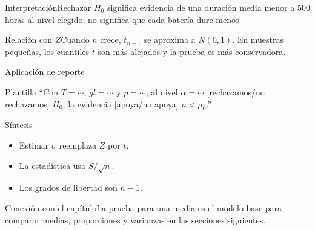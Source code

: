 \documentclass[10pt,aspectratio=169]{beamer}
\begin{document}
\begin{frame}{Interpretación}\small Rechazar $H_0$ significa evidencia de una duración media menor a $500$ horas al nivel elegido; no significa que cada batería dure menos.\end{frame}
\begin{frame}{Relación con $Z$}\small Cuando $n$ crece, $t_{n-1}$ se aproxima a $N(0,1)$. En muestras pequeñas, los cuantiles $t$ son más alejados y la prueba es más conservadora.\end{frame}
\begin{frame}{Aplicación de reporte}\small\begin{block}{Plantilla} ``Con $T=\cdots$, $gl=\cdots$ y $p=\cdots$, al nivel $\alpha=\cdots$ [rechazamos/no rechazamos] $H_0$; la evidencia [apoya/no apoya] $\mu<\mu_0$.''\end{block}\end{frame}
\begin{frame}{Síntesis}\small\begin{itemize}\item Estimar $\sigma$ reemplaza $Z$ por $t$.\item La estadística usa $S/\sqrt n$.\item Los grados de libertad son $n-1$.\end{itemize}\end{frame}
\begin{frame}{Conexión con el capítulo}\small La prueba para una media es el modelo base para comparar medias, proporciones y varianzas en las secciones siguientes.\end{frame}
\end{document}

